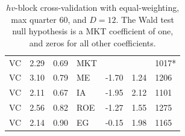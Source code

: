 \documentclass[12pt]{article}
\begin{document}
\begin{table}[ht]
\begin{tabular}{lrrlrrl}
		\hline
		VC & 2.29 & 0.69 & MKT &  &  & 1017* \\ 
		VC & 3.10 & 0.79 & ME & -1.70 & 1.24 & 1206 \\ 
		VC & 2.11 & 0.67 & IA & -1.95 & 2.12 & 1101 \\ 
		VC & 2.56 & 0.82 & ROE & -1.27 & 1.55 & 1275 \\ 
		VC & 2.14 & 0.90 & EG & -0.15 & 1.98 & 1165 \\ 
		\hline
		\hline
	\end{tabular}
	\caption{$hv$-block cross-validation with equal-weighting, max quarter 60, and $D=12$. The Wald test null hypothesis is a MKT coefficient of one, and zeros for all other coefficients.}
	\label{tab:cv_60_ew_dep} 
\end{table}
\end{document}
